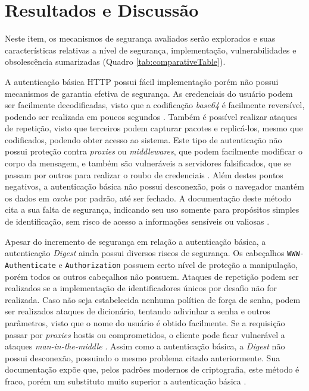 \section{Resultados e Discussão}

Neste item, os mecanismos de segurança avaliados serão explorados e suas características relativas 
a nível de segurança, implementação, vulnerabilidades e obsolescência sumarizadas (Quadro 
\ref{tab:comparativeTable}).

A autenticação básica HTTP possui fácil implementação porém não possui mecanismos de 
garantia efetiva de segurança. As credenciais do usuário podem ser facilmente decodificadas, visto 
que a codificação \emph{base64} é facilmente reversível, podendo ser realizada em poucos segundos
\cite{GOURLEY2002}. Também é possível realizar ataques de repetição, visto que terceiros podem 
capturar pacotes e replicá-los, mesmo que codificados, podendo obter acesso ao sistema. Este tipo 
de autenticação não possui proteção contra \emph{proxies} ou \emph{middlewares}, que podem 
facilmente modificar o corpo da mensagem, e também são vulneráveis a servidores falsificados, 
que se passam por outros para realizar o roubo de credenciais \cite{GOURLEY2002}. Além destes 
pontos negativos, a autenticação básica não possui desconexão, pois o navegador mantém 
os dados em \emph{cache} por padrão, até ser fechado. A documentação deste método cita a sua falta 
de segurança, indicando seu uso somente para propósitos simples de identificação, sem risco de 
acesso a informações sensíveis ou valiosas \cite{RFC7617}. 

Apesar do incremento de segurança em relação a autenticação básica, a autenticação 
\emph{Digest} ainda possui diversos riscos de segurança. Os cabeçalhos 
\texttt{WWW-Authenticate} e \texttt{Authorization} possuem certo nível de proteção a manipulação, 
porém todos os outros cabeçalhos não possuem. Ataques de repetição podem ser realizados se a 
implementação de identificadores únicos por desafio não for realizada. Caso não seja estabelecida 
nenhuma política de força de senha, podem ser realizados ataques de dicionário, tentando adivinhar 
a senha e outros parâmetros, visto que o nome do usuário é obtido facilmente. Se a requisição 
passar por \emph{proxies} hostis ou comprometidos, o cliente pode ficar vulnerável a ataques 
\emph{man-in-the-middle} \cite{GOURLEY2002}. Assim como a autenticação básica, a \emph{Digest} não 
possui desconexão, possuindo o mesmo problema citado
anteriormente. Sua documentação expõe que, pelos padrões modernos de criptografia, este método 
é fraco, porém um substituto muito superior a autenticação básica \cite{RFC7616}.

